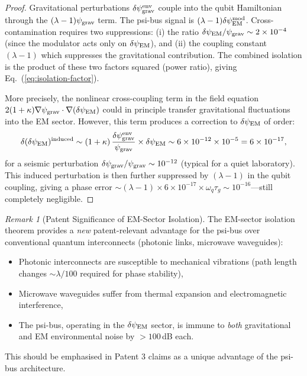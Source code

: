 \documentclass[11pt]{article}
\theoremstyle{definition}
\theoremstyle{remark}
\newtheorem{remark}[theorem]{Remark}
\newcommand{\ee}[1]{\times 10^{#1}}
\newcommand{\psigrav}{\psi_{\rm grav}}
\newcommand{\dpsiEM}{\delta\psi_{\rm EM}}
\begin{document}
\begin{proof}
Gravitational perturbations $\delta\psigrav^{\rm env}$ couple into the
qubit Hamiltonian through the $(\lambda-1)\psigrav$ term.  The psi-bus
signal is $(\lambda-1)\dpsiEM^{\rm mod}$.  Cross-contamination requires
two suppressions: (i) the ratio $\dpsiEM/\psigrav \sim 2\ee{-4}$
(since the modulator acts only on $\dpsiEM$), and (ii) the coupling
constant $(\lambda-1)$ which suppresses the gravitational contribution.
The combined isolation is the product of these two factors squared
(power ratio), giving Eq.~(\ref{eq:isolation-factor}).

More precisely, the nonlinear cross-coupling term in the field equation
$2(1+\kappa)\nabla\psigrav\cdot\nabla(\dpsiEM)$ could in principle
transfer gravitational fluctuations into the EM sector.  However, this
term produces a correction to $\dpsiEM$ of order:
\begin{equation}
  \delta(\dpsiEM)^{\rm induced} \sim (1+\kappa)\,
  \frac{\delta\psigrav^{\rm env}}{\psigrav}\times\dpsiEM
  \sim 6\times 10^{-12}\times 10^{-5} = 6\ee{-17},
\end{equation}
for a seismic perturbation $\delta\psigrav/\psigrav \sim 10^{-12}$
(typical for a quiet laboratory).  This induced perturbation is then
further suppressed by $(\lambda-1)$ in the qubit coupling, giving
a phase error $\sim (\lambda-1)\times 6\ee{-17}\times\omega_q\tau_g
\sim 10^{-16}$---still completely negligible.
\end{proof}

\begin{remark}[Patent Significance of EM-Sector Isolation]
\label{rem:patent-significance}
The EM-sector isolation theorem provides a \emph{new} patent-relevant
advantage for the psi-bus over conventional quantum interconnects
(photonic links, microwave waveguides):
\begin{itemize}[nosep]
  \item Photonic interconnects are susceptible to mechanical vibrations
    (path length changes $\sim\lambda/100$ required for phase stability),
  \item Microwave waveguides suffer from thermal expansion and
    electromagnetic interference,
  \item The psi-bus, operating in the $\dpsiEM$ sector, is immune to
    \emph{both} gravitational and EM environmental noise by
    $>100$\,dB each.
\end{itemize}
This should be emphasised in Patent 3 claims as a unique advantage
of the psi-bus architecture.
\end{remark}
\end{document}
